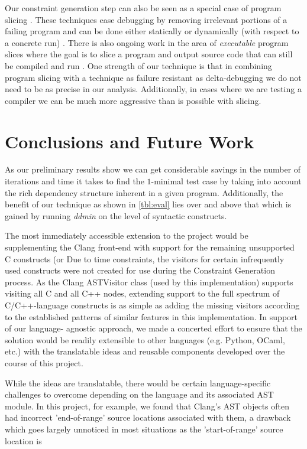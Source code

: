 \documentclass[preprint]{acm_proc_article-sp}
\begin{document}
Our constraint generation step can also be seen as a special case of program
slicing \citep{weiser81} \citep{tip94}. These techniques ease debugging by
removing irrelevant portions of a failing program and can be done either
statically or dynamically (with respect to a concrete run)
\citep{agrawal90}. There is also ongoing work in the area of \emph{executable}
program slices where the goal is to slice a program and output source code
that can still be compiled and run \citep{horwitz10}. One strength of our
technique is that in combining program slicing with a technique as failure
resistant as delta-debugging we do not need to be as precise in our
analysis. Additionally, in cases where we are testing a compiler we can be much
more aggressive than is possible with slicing.


\section{Conclusions and Future Work}
As our preliminary results show we can get considerable savings in the number of
iterations and time it takes to find the $1$-minimal test case by taking into
account the rich dependency structure inherent in a given program. Additionally,
the benefit of our technique as shown in \autoref{tbl:eval} lies over and above
that which is gained by running \emph{ddmin} on the level of syntactic
constructs.

The most immediately accessible extension to the project would be supplementing
the Clang front-end with support for the remaining unsupported C constructs (or
Due to time constraints, the visitors for certain infrequently used constructs
were not created for use during the Constraint Generation process. As the Clang
ASTVisitor class (used by this implementation) supports visiting all C and all
C++ nodes, extending support to the full spectrum of C/C++-language constructs
is as simple as adding the missing visitors according to the established
patterns of similar features in this implementation. In support of our language-
agnostic approach, we made a concerted effort to ensure that the solution would
be readily extensible to other languages (e.g. Python, OCaml, etc.) with the
translatable ideas and reusable components developed over the course of this
project.

While the ideas are translatable, there would be certain language-specific
challenges to overcome depending on the language and its associated AST module.
In this project, for example, we found that Clang's AST objects often had
incorrect 'end-of-range' source locations associated with them, a drawback which
goes largely unnoticed in most situations as the 'start-of-range' source
location is
\end{document}
